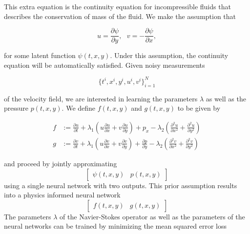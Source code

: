 \documentclass[book.tex]{subfiles}
\begin{document}
This extra equation is the continuity equation for incompressible fluids that describes the conservation of mass of the fluid. We make the assumption that

\begin{equation}
u = \frac{\partial \psi}{\partial y},\ \ \ v = -\frac{\partial \psi}{\partial x},    
\end{equation}


for some latent function $\psi(t,x,y)$. Under this assumption, the continuity equation will be automatically satisfied. Given noisy measurements

\begin{equation}
\{t^i, x^i, y^i, u^i, v^i\}_{i=1}^{N}    
\end{equation}


of the velocity field, we are interested in learning the parameters $\lambda$ as well as the pressure $p(t,x,y)$. We define $f(t,x,y)$ and $g(t,x,y)$ to be given by

\begin{align}
f &:= \frac{\partial u}{\partial t} + \lambda_1 \left (u \frac{\partial u}{\partial x} + v \frac{\partial u}{\partial y} \right) + p_x - \lambda_2 \left (\frac{\partial^2 u}{\partial x^2} + \frac{\partial^2 u}{\partial y^2}\right )\\
g &:= \frac{\partial v}{\partial t} + \lambda_1 \left (u \frac{\partial v}{\partial x} + v \frac{\partial v}{\partial y} \right) + \frac{\partial p}{\partial y} - \lambda_2 \left (\frac{\partial^2 v}{\partial x^2} + \frac{\partial^2 v}{\partial y^2} \right)        
\end{align}

\noindent and proceed by jointly approximating \[\begin{bmatrix}
\psi(t,x,y) & p(t,x,y)
\end{bmatrix} \] 
using a single neural network with two outputs. This prior assumption results into a physics informed neural network \[\begin{bmatrix}
f(t,x,y) & g(t,x,y)
\end{bmatrix} \]
The parameters $\lambda$ of the Navier-Stokes operator as well as the parameters of the neural networks can be trained by minimizing the mean squared error loss
\end{document}
